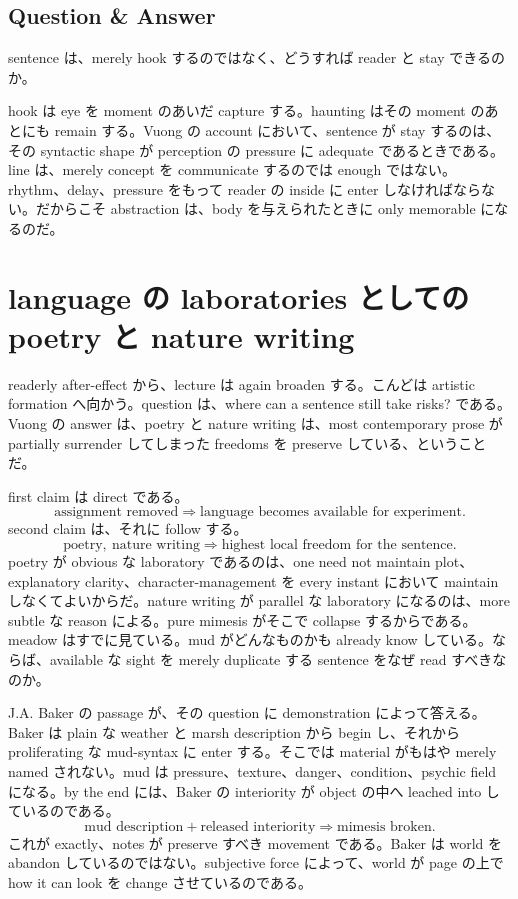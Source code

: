 \subsection{Question \& Answer}

sentence は、merely hook するのではなく、どうすれば reader と stay できるのか。

hook は eye を moment のあいだ capture する。haunting はその moment のあとにも remain する。Vuong の account において、sentence が stay するのは、その syntactic shape が perception の pressure に adequate であるときである。line は、merely concept を communicate するのでは enough ではない。rhythm、delay、pressure をもって reader の inside に enter しなければならない。だからこそ abstraction は、body を与えられたときに only memorable になるのだ。

\section{language の laboratories としての poetry と nature writing}

readerly after-effect から、lecture は again broaden する。こんどは artistic formation へ向かう。question は、where can a sentence still take risks? である。Vuong の answer は、poetry と nature writing は、most contemporary prose が partially surrender してしまった freedoms を preserve している、ということだ。

first claim は direct である。
\begin{equation}
\text{assignment removed} \Longrightarrow \text{language becomes available for experiment}.
\end{equation}
second claim は、それに follow する。
\begin{equation}
\text{poetry},\ \text{nature writing} \Longrightarrow \text{highest local freedom for the sentence}.
\end{equation}
poetry が obvious な laboratory であるのは、one need not maintain plot、explanatory clarity、character-management を every instant において maintain しなくてよいからだ。nature writing が parallel な laboratory になるのは、more subtle な reason による。pure mimesis がそこで collapse するからである。meadow はすでに見ている。mud がどんなものかも already know している。ならば、available な sight を merely duplicate する sentence をなぜ read すべきなのか。

J.A. Baker の passage が、その question に demonstration によって答える。Baker は plain な weather と marsh description から begin し、それから proliferating な mud-syntax に enter する。そこでは material がもはや merely named されない。mud は pressure、texture、danger、condition、psychic field になる。by the end には、Baker の interiority が object の中へ leached into しているのである。
\begin{equation}
\text{mud description} + \text{released interiority} \Longrightarrow \text{mimesis broken}.
\end{equation}
これが exactly、notes が preserve すべき movement である。Baker は world を abandon しているのではない。subjective force によって、world が page の上で how it can look を change させているのである。

